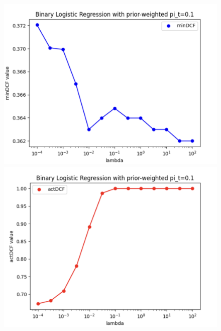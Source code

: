\documentclass{article}
\begin{document}
    \begin{figure}[H]
        \centering
        \begin{minipage}{.23\textwidth}
            \centering
            \includegraphics[width=\linewidth]{./img/LLR_W1.png}
        \end{minipage}%
        \begin{minipage}{.23\textwidth}
            \centering
            \includegraphics[width=\linewidth]{./img/LLR_W2.png}
        \end{minipage}
        \begin{minipage}{.23\textwidth}
            \centering

\end{minipage}
\end{figure}
\end{document}
